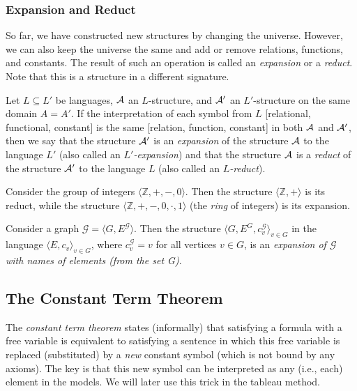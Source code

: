 \subsubsection{Expansion and Reduct}

So far, we have constructed new structures by changing the universe. However, we can also keep the universe the same and add or remove relations, functions, and constants. The result of such an operation is called an \emph{expansion} or a \emph{reduct}. Note that this is a structure in a different signature.

\begin{definition}
    Let $L\subseteq L'$ be languages, $\mathcal{A}$ an $L$-structure, and $\mathcal{A}'$ an $L'$-structure on the same domain $A=A'$. If the interpretation of each symbol from $L$ [relational, functional, constant] is the same [relation, function, constant] in both $\mathcal{A}$ and $\mathcal{A}'$, then we say that the structure $\mathcal{A}'$ is an \emph{expansion} of the structure $\mathcal{A}$ to the language $L'$ (also called an \emph{$L'$-expansion}) and that the structure $\mathcal{A}$ is a \emph{reduct} of the structure $\mathcal{A}'$ to the language $L$ (also called an \emph{$L$-reduct}).    
\end{definition}

\begin{example}
    Consider the group of integers $\langle\mathbb Z,+,-,0\rangle$. Then the structure $\langle \mathbb Z,+\rangle$ is its reduct, while the structure $\langle\mathbb Z,+,-,0,\cdot,1\rangle$ (the \emph{ring} of integers) is its expansion.
\end{example}

\begin{example}
    Consider a graph $\mathcal G=\langle G, E^\mathcal G\rangle$. Then the structure $\langle G, E^G,c_v^\mathcal G\rangle_{v\in G}$ in the language $\langle E,c_v\rangle_{v\in G}$, where $c_v^\mathcal G=v$ for all vertices $v\in G$, is an \emph{expansion of $\mathcal G$ with names of elements (from the set G)}.
\end{example}


\subsection{The Constant Term Theorem}

The \emph{constant term theorem} states (informally) that satisfying a formula with a free variable is equivalent to satisfying a sentence in which this free variable is replaced (substituted) by a \emph{new} constant symbol (which is not bound by any axioms). The key is that this new symbol can be interpreted as any (i.e., each) element in the models. We will later use this trick in the tableau method.

